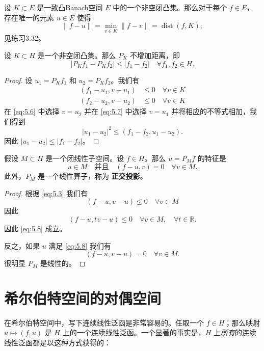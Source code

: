 \begin{remark}
设 $K \subset E$ 是一致凸Banach空间 $E$ 中的一个非空闭凸集。那么对于每个 $f \in E$，存在唯一的元素 $u \in E$ 使得
\[ \|f-u\| = \min_{v \in K} \|f-v\| = \operatorname{dist}(f,K); \]
见练习3.32。
\end{remark}

\begin{proposition}\label{prop:5.3}
设 $K \subset H$ 是一个非空闭凸集。那么 $P_K$ 不增加距离，即
\[ |P_K f_1 - P_K f_2| \le |f_1 - f_2| \quad \forall f_1, f_2 \in H. \]
\end{proposition}
\begin{proof}
设 $u_1 = P_K f_1$ 和 $u_2 = P_K f_2$。我们有
\begin{align}
(f_1 - u_1, v - u_1) &\le 0 \quad \forall v \in K \label{eq:5.6} \\
(f_2 - u_2, v - u_2) &\le 0 \quad \forall v \in K \label{eq:5.7}
\end{align}
在 \eqref{eq:5.6} 中选择 $v=u_2$ 并在 \eqref{eq:5.7} 中选择 $v=u_1$ 并将相应的不等式相加，我们得到
\[ |u_1 - u_2|^2 \le (f_1 - f_2, u_1 - u_2). \]
因此 $|u_1 - u_2| \le |f_1-f_2|$。
\end{proof}

\begin{corollary}\label{cor:5.4}
假设 $M \subset H$ 是一个闭线性子空间。设 $f \in H$。那么 $u=P_M f$ 的特征是
\begin{equation}\label{eq:5.8}
u \in M \quad \text{并且} \quad (f-u, v) = 0 \quad \forall v \in M.
\end{equation}
此外，$P_M$ 是一个线性算子，称为 \textbf{正交投影}。
\end{corollary}
\begin{proof}
根据 \eqref{eq:5.3} 我们有
\[ (f-u, v-u) \le 0 \quad \forall v \in M \]
因此
\[ (f-u, tv-u) \le 0 \quad \forall v \in M, \quad \forall t \in \mathbb{R}. \]
因此 \eqref{eq:5.8} 成立。

反之，如果 $u$ 满足 \eqref{eq:5.8} 我们有
\[ (f-u, v-u) = 0 \quad \forall v \in M. \]
很明显 $P_M$ 是线性的。
\end{proof}

\section{希尔伯特空间的对偶空间}
\label{sec:5.2}

在希尔伯特空间中，写下连续线性泛函是非常容易的。任取一个 $f \in H$；那么映射 $u \mapsto (f,u)$ 是 $H$ 上的一个连续线性泛函。一个显著的事实是，$H$ 上\textit{所有}的连续线性泛函都是以这种方式获得的：

